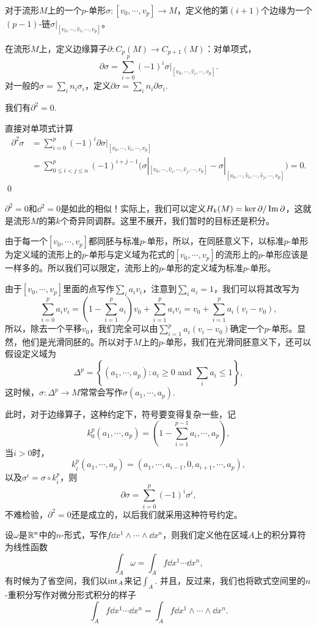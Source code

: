 对于流形$M$上的一个$p$-单形$\sigma:[v_0,\cdots,v_p]\to M$，定义他的第$(i+1)$个边缘为一个$(p-1)$-链$\sigma|_{[v_0,\cdots,\hat{v}_i,\cdots,v_p]}$。

\para 在流形$M$上，定义边缘算子$\partial:C_p(M)\to C_{p+1}(M)$：对单项式，
\[
	\partial \sigma=\sum_{i=0}^p (-1)^i\sigma|_{[v_0,\cdots,\hat{v}_i,\cdots,v_p]}.
\]
对一般的$\sigma=\sum_i n_i \sigma_i$，定义$\partial \sigma =\sum_i n_i \partial \sigma_i$.

\para 我们有$\partial^2=0$.

\proof 直接对单项式计算
\[
\begin{split}
	\partial^2 \sigma&=\sum_{i=0}^p (-1)^i\partial\sigma|_{[v_0,\cdots,\hat{v}_i,\cdots,v_p]}\\
	&=\sum_{0\leq i<j\leq n}^p (-1)^{i+j-1}\bigl(\sigma|_{[v_0,\cdots,\hat{v}_i,\cdots,\hat{v}_j,\cdots,v_p]}-\sigma|_{[v_0,\cdots,\hat{v}_i,\cdots,\hat{v}_j,\cdots,v_p]}\bigr)=0.
\end{split}
\]\qed

$\partial^2=0$和$\dd^2=0$是如此的相似！实际上，我们可以定义$H_k(M)=\ker\partial/\operatorname{Im}\partial$，这就是流形$M$的第$k$个奇异同调群。这里不展开，我们暂时的目标还是积分。

\para 由于每一个$[v_0,\cdots,v_p]$都同胚与标准$p$-单形，所以，在同胚意义下，以标准$p$-单形为定义域的流形上的$p$-单形与定义域为花式的$[v_0,\cdots,v_p]$的流形上的$p$-单形应该是一样多的。所以我们可以限定，流形上的$p$-单形的定义域为标准$p$-单形。

\para 由于$[v_0,\cdots,v_p]$里面的点写作$\sum_i a_i v_i$，注意到$\sum_i a_i=1$，我们可以将其改写为
\[
	\sum_{i=0}^pa_iv_i=\left(1-\sum_{i=1}^pa_i\right)v_0+\sum_{i=1}^pa_iv_i=v_0+\sum_{i=1}^pa_i(v_i-v_0),
\]
所以，除去一个平移$v_0$，我们完全可以由$\sum_{i=1}^pa_i(v_i-v_0)$确定一个$p$-单形。显然，他们是光滑同胚的。所以对于$M$上的$p$-单形，我们在光滑同胚意义下，还可以假设定义域为
\[
	\Delta^p=\left\{(a_1,\cdots,a_p):a_i\geq 0\text{ and }\sum_i a_i\leq 1\right\},
\]
这时候，$\sigma:\Delta^p\to M$常常会写作$\sigma(a_1,\cdots,a_p)$.

此时，对于边缘算子，这种约定下，符号要变得复杂一些，记
\[
	k^p_0(a_1,\cdots,a_{p})=\left(1-\sum_{i=1}^{p-1}a_i,\cdots,a_{p}\right),
\]
当$i>0$时，
\[
	k^p_i(a_1,\cdots,a_{p})=(a_1,\cdots,a_{i-1},0,a_{i+1},\cdots,a_{p}),
\]
以及$\sigma^i=\sigma\circ k^p_i$，则
\[
	\partial\sigma=\sum_{i=0}^p(-1)^i \sigma^i,
\]
不难检验，$\partial^2=0$还是成立的，以后我们就采用这种符号约定。

\para 设$\omega$是$\mathbb{R}^n$中的$n$-形式，写作$f\dd x^1\wedge\cdots\wedge \dd x^n$，则我们定义他在区域$A$上的积分算符为线性函数
\[
	\int_A \omega=\int_A f \dd x^1\cdots\dd x^n,
\]
有时候为了省空间，我们以$\operatorname{int}_A$来记$\int_A$. 并且，反过来，我们也将欧式空间里的$n$-重积分写作对微分形式积分的样子
\[
	\int_A f \dd x^1\cdots\dd x^n=\int_A f\dd x^1\wedge\cdots\wedge \dd x^n.
\]

